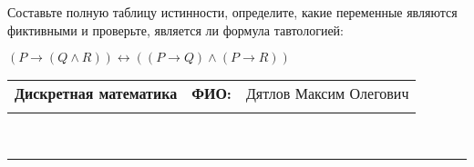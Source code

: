 \documentclass[10pt]{exam}
\newcommand{\class}{Дискретная математика}
\newcommand{\examdate}{}
\begin{document}
\begin{questions}
\begin{enumerate}[a)]
\end{enumerate}\question Составьте полную таблицу истинности, определите, какие переменные являются фиктивными и проверьте, является ли формула тавтологией:

$(P \rightarrow (Q \land R)) \leftrightarrow ((P \rightarrow Q) \land (P \rightarrow R))$

\end{questions}
\newpage
\begin{flushright}
\begin{tabular}{p{2.8in} r l}
\textbf{\class} & \textbf{ФИО:} &Дятлов Максим Олегович
\\

\textbf{\examdate} &&\\
\end{tabular}\\
\end{flushright}
\rule[1ex]{\textwidth}{.1pt}
\end{document}
